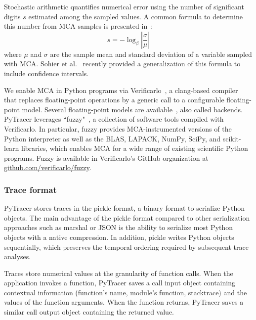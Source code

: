 \documentclass[10pt,journal,compsoc]{IEEEtran}
\newcommand{\pytracer}[0]{PyTracer\xspace}
\begin{document}
Stochastic arithmetic quantifies numerical error using the number of significant
digits $s$ estimated among the sampled values. A common formula to determine
this number from MCA samples is presented in~\cite{parker1997monte}:
\begin{equation}
    s = -\log_{\beta}{ \left| \dfrac{\sigma}{\mu} \right|} \label{eq:sig-digits}
\end{equation}
where $\mu$ and $\sigma$ are the sample mean and standard deviation of a
variable sampled with MCA.
Sohier et al.~\cite{sohier2021confidence} recently provided a generalization of
this formula to include confidence intervals.

We enable MCA in Python programs via Verificarlo~\cite{verificarlo}, a
clang-based compiler~\cite{lattner2008llvm} that replaces floating-point
operations by a generic call to a configurable floating-point model. Several
floating-point models are
available~\cite{chatelain2019automatic,chatelain2019outils}, also called
backends. \pytracer leverages ``fuzzy"~\cite{kiar2020comparing}, a collection of
software tools compiled with Verificarlo. In particular, fuzzy provides
MCA-instrumented versions of the Python interpreter as well as the BLAS, LAPACK,
NumPy, SciPy, and scikit-learn libraries, which enables MCA for a wide range of
existing scientific Python programs. Fuzzy is available in Verificarlo's GitHub
organization at
\href{https://github.com/verificarlo/fuzzy}{\url{github.com/verificarlo/fuzzy}}.

\subsubsection{Trace format}

\pytracer stores traces in the pickle format, a binary format to serialize
Python objects. The main advantage of the pickle format compared to other
serialization approaches such as marshal or JSON is the ability to serialize
most Python objects with a native compression. In addition, pickle writes
Python objects sequentially, which preserves the temporal ordering required by
subsequent trace analyses.

Traces store numerical values at the granularity of function calls. When the
application invokes a function, \pytracer saves a call input object containing
contextual information (function's name, module's function, stacktrace) and the
values of the function arguments. When the function returns, \pytracer saves a
similar call output object containing the returned value. 
\end{document}
